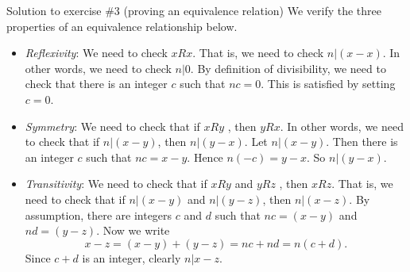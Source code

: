 \documentclass[10pt]{beamer}
\begin{document}
\begin{frame}{Solution to exercise \#3 (proving an equivalence relation)}
\small 
\pause 
We verify the three properties of an equivalence relationship below. 

\begin{itemize}
\item \textit{Reflexivity}: \pause  We need to check $xRx$. That is, we need to check $n|(x-x)$. In other words, we need to check $n|0$.  By definition of divisibility, we need to check that there is an integer $c$ such that $nc=0$.  This is satisfied by setting $c=0$. \; \greencheck 
\item \textit{Symmetry}:\pause   \; We need to check that if $xRy$ , then $yRx$.  In other words, we need to check that if $n|(x-y)$, then $n|(y-x)$.  Let $n|(x-y)$. Then there is an integer $c$ such that $nc = x-y$.  Hence $n(-c) = y-x$.  So $n|(y-x)$.  \; \greencheck  
\item \textit{Transitivity}:  \pause  We need to check that if $xRy$ and $yRz$ , then $xRz$.   That is, we need to check that if $n|(x-y)$ and $n|(y-z)$, then $n|(x-z)$.  By assumption, there are integers $c$ and $d$ such that $nc=(x-y)$ and $nd=(y-z)$.  Now we write
 	\[ x-z = (x-y) + (y-z) = nc + nd = n(c+d).\]
 	Since $c+d$ is an integer, clearly $n|x-z$. \; \greencheck
\end{itemize}
\end{frame}
\end{document}
